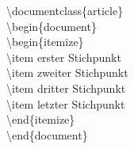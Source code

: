 \color{nounibaredI}\textbackslash documentclass\color{black}\{article\}\\
\color{unibablueI}\textbackslash\color{unibablueI}begin\color{black}\{document\} \\
\color{unibablueI}\textbackslash\color{unibablueI}begin\color{black}\{itemize\} \\
\color{nounibaredI}\textbackslash item \color{black} erster Stichpunkt \\
\color{nounibaredI}\textbackslash item \color{black} zweiter Stichpunkt \\
\color{nounibaredI}\textbackslash item \color{black} dritter Stichpunkt \\
\color{nounibaredI}\textbackslash item \color{black} letzter Stichpunkt \\
\color{unibablueI}\textbackslash\color{unibablueI}end\color{black}\{itemize\} \\
\color{unibablueI}\textbackslash\color{unibablueI}end\color{black}\{document\} \\